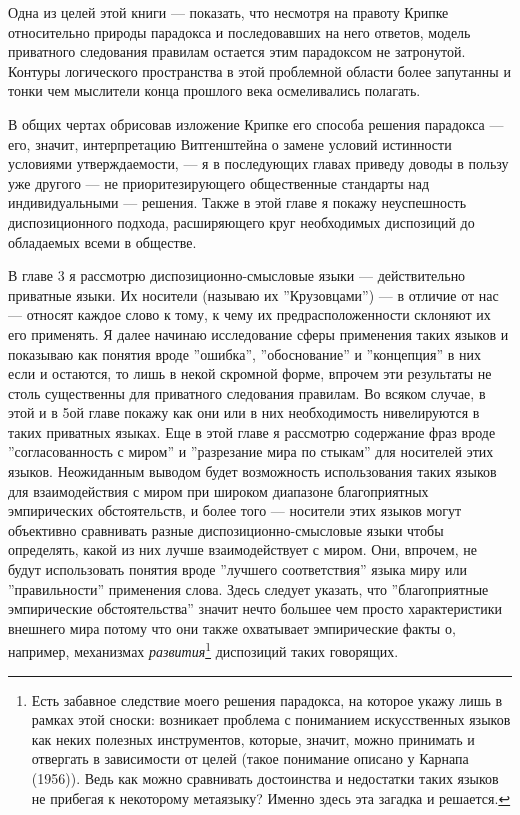 \documentclass[11pt]{book}
\begin{document}
\smallskip

Одна из целей этой книги --- показать, что несмотря на правоту Крипке относительно природы парадокса и последовавших на него ответов, модель приватного следования правилам остается этим парадоксом не затронутой. Контуры логического пространства в этой проблемной области более запутанны и тонки чем мыслители конца прошлого века осмеливались полагать.

В общих чертах обрисовав изложение Крипке его способа решения парадокса --- его, значит, интерпретацию Витгенштейна о замене условий истинности условиями утверждаемости, --- я в последующих главах приведу доводы в пользу уже другого --- не приоритезирующего общественные стандарты над индивидуальными --- решения. Также в этой главе я покажу неуспешность диспозиционного подхода, расширяющего круг необходимых диспозиций до обладаемых всеми в обществе.

В главе 3 я рассмотрю диспозиционно-смысловые языки --- действительно приватные языки. Их носители (называю их ''Крузовцами'') --- в отличие от нас --- относят каждое слово к тому, к чему их предрасположенности склоняют их его применять. Я далее начинаю исследование сферы применения таких языков и показываю как понятия вроде ''ошибка'', ''обоснование'' и ''концепция'' в них если и остаются, то лишь в некой скромной форме, впрочем эти результаты не столь существенны для приватного следования правилам. Во всяком случае, в этой и в 5ой главе покажу как они или в них необходимость нивелируются в таких приватных языках. Еще в этой главе я рассмотрю содержание фраз вроде ''согласованность с миром'' и ''разрезание мира по стыкам'' для носителей этих языков. Неожиданным выводом будет возможность использования таких языков для взаимодействия с миром при широком диапазоне благоприятных эмпирических обстоятельств, и более того --- носители этих языков могут объективно сравнивать разные диспозиционно-смысловые языки чтобы определять, какой из них лучше взаимодействует с миром. Они, впрочем, не будут использовать понятия вроде ''лучшего соответствия'' языка миру или ''правильности'' применения слова. Здесь следует указать, что ''благоприятные эмпирические обстоятельства'' значит нечто большее чем просто характеристики внешнего мира потому что они также охватывает эмпирические факты о, например, механизмах \textit{развития}\footnote{Есть забавное следствие моего решения парадокса, на которое укажу лишь в рамках этой сноски: возникает проблема с пониманием искусственных языков как неких полезных инструментов, которые, значит, можно принимать и отвергать в зависимости от целей (такое понимание описано у Карнапа (1956)). Ведь как можно сравнивать достоинства и недостатки таких языков не прибегая к некоторому метаязыку? Именно здесь эта загадка и решается.} диспозиций таких говорящих.
\end{document}
